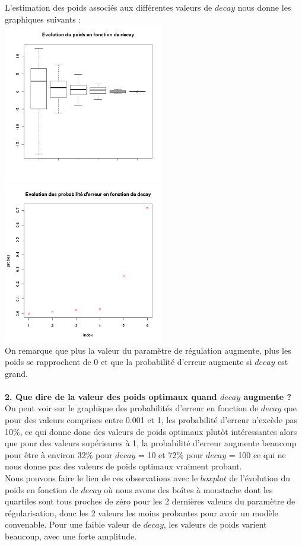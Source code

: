 \documentclass[a4paper, 10pt]{article}
\begin{document}
L'estimation des poids associés aux différentes valeurs de $decay$ nous donne les graphiques suivants :\\
\includegraphics[height = 7cm, width = 7cm]{plots/poids_q4_2.png}
\includegraphics[height = 7cm, width = 7cm]{plots/probas_erreur_q4_3.png}\\
On remarque que plus la valeur du paramètre de régulation augmente, plus les poids se rapprochent de 0 et que la probabilité d'erreur augmente si $decay$ est grand.\\ \\
\textbf{2. Que dire de la valeur des poids optimaux quand $decay$ augmente ?}\\
On peut voir sur le graphique des probabilités d'erreur en fonction de $decay$ que pour des valeurs comprises entre 0.001 et 1, les probabilité d'erreur n'excède pas 10\%, ce qui donne donc des valeurs de poids optimaux plutôt intéressantes alors que pour des valeurs supérieures à 1, la probabilité d'erreur augmente beaucoup pour être à environ 32\% pour $decay$ = 10 et 72\% pour $decay$ = 100 ce qui ne nous donne pas des valeurs de poids optimaux vraiment probant.\\
Nous pouvons faire le lien de ces observations avec le $boxplot$ de l'évolution du poids en fonction de $decay$ où nous avons des boîtes à moustache dont les quartiles sont tous proches de zéro pour les 2 dernières valeurs du paramètre de régularisation, donc les 2 valeurs les moins probantes pour avoir un modèle convenable. Pour une faible valeur de $decay$, les valeurs de poids varient beaucoup, avec une forte amplitude.\\ \\
\end{document}
